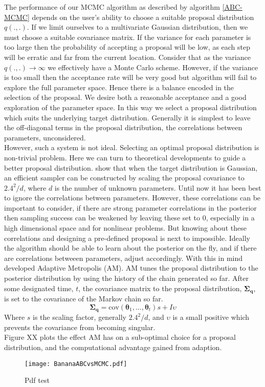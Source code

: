 The performance of our MCMC algorithm as described by algorithm \ref{ABC-MCMC} depends on the user's ability to choose a suitable proposal distribution $q(.,.)$. If we limit ourselves to a multivariate Gaussian distribution, then we must choose a suitable covariance matrix. If the variance for each parameter is too large then the probability of accepting a proposal will be low, as each step will be erratic and far from the current location. Consider that as the variance $q(.,.) \rightarrow \infty$ we effectively have a Monte Carlo scheme. However, if the variance is too small then the acceptance rate will be very good but algorithm will fail to explore the full parameter space. Hence there is a balance encoded in the selection of the proposal. We desire both a reasonable acceptance and a good exploration of the parameter space. In this way we select a proposal distribution which suits the underlying target distribution. Generally it is simplest to leave the off-diagonal terms in the proposal distribution, the correlations between parameters, unconsidered.\\

However, such a system is not ideal. Selecting an optimal proposal distribution is non-trivial problem. Here we can turn to theoretical developments to guide a better proposal distribution. \citet{gelman1996} show that when the target distribution is Gaussian, an efficient sampler can be constructed by scaling the proposal covariance to $2.4^2/d$, where $d$ is the number of unknown parameters. Until now it has been best to ignore the correlations between parameters. However, these correlations can be important to consider, if there are strong parameter correlations in the posterior then sampling success can be weakened by leaving these set to 0, especially in a high dimensional space and for nonlinear problems. But knowing about these correlations and designing a pre-defined proposal is next to impossible. Ideally the algorithm should be able to learn about the posterior on the fly, and if there are correlations betweeen parameters, adjust accordingly. With this in mind \citet{haario2001} developed Adaptive Metropolis (AM). AM tunes the proposal distribution to the posterior distribution by using the history of the chain generated so far. After some designated time, $t$, the covariance matrix to the proposal distribution, $\bm{\Sigma_q}$, is set to the covariance of the Markov chain so far. 
\begin{equation}
\bm{\Sigma_q} = \text{cov}(\bm{\theta}_1,\dots,\bm{\theta}_t)s + I\upsilon
\end{equation}
Where $s$ is the scaling factor, generally $2.4^2/d$, and $\upsilon$ is a small positive which prevents the covariance from becoming singular. \\

Figure XX plots the effect AM has on a sub-optimal choice for a proposal distribution, and the computational advantage gained from adaption. \\

\begin{figure}[H]
\centering
\texttt{[image: BananaABCvsMCMC.pdf]}
\caption{Pdf test}
\end{figure}
